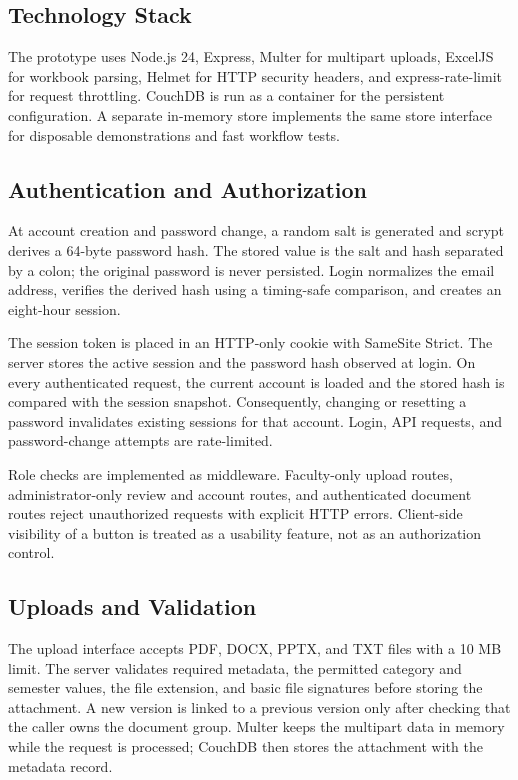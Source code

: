 \documentclass[conference]{IEEEtran}
\begin{document}
\subsection{Technology Stack}
The prototype uses Node.js 24, Express, Multer for multipart uploads, ExcelJS for workbook parsing, Helmet for HTTP security headers, and express-rate-limit for request throttling. CouchDB is run as a container for the persistent configuration. A separate in-memory store implements the same store interface for disposable demonstrations and fast workflow tests.

\subsection{Authentication and Authorization}
At account creation and password change, a random salt is generated and scrypt derives a 64-byte password hash. The stored value is the salt and hash separated by a colon; the original password is never persisted. Login normalizes the email address, verifies the derived hash using a timing-safe comparison, and creates an eight-hour session.

The session token is placed in an HTTP-only cookie with SameSite Strict. The server stores the active session and the password hash observed at login. On every authenticated request, the current account is loaded and the stored hash is compared with the session snapshot. Consequently, changing or resetting a password invalidates existing sessions for that account. Login, API requests, and password-change attempts are rate-limited.

Role checks are implemented as middleware. Faculty-only upload routes, administrator-only review and account routes, and authenticated document routes reject unauthorized requests with explicit HTTP errors. Client-side visibility of a button is treated as a usability feature, not as an authorization control.

\subsection{Uploads and Validation}
The upload interface accepts PDF, DOCX, PPTX, and TXT files with a 10 MB limit. The server validates required metadata, the permitted category and semester values, the file extension, and basic file signatures before storing the attachment. A new version is linked to a previous version only after checking that the caller owns the document group. Multer keeps the multipart data in memory while the request is processed; CouchDB then stores the attachment with the metadata record.
\end{document}
